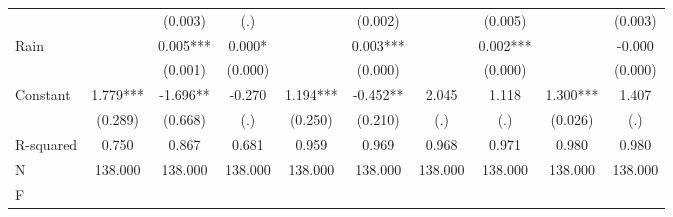 {\begin{tabular}{l*{9}{c}}
                    &               &     (0.003)   &         (.)   &               &     (0.002)   &               &     (0.005)   &               &     (0.003)   \\
Rain                &               &       0.005***&       0.000*  &               &       0.003***&               &       0.002***&               &      -0.000   \\
                    &               &     (0.001)   &     (0.000)   &               &     (0.000)   &               &     (0.000)   &               &     (0.000)   \\
Constant            &       1.779***&      -1.696** &      -0.270   &       1.194***&      -0.452** &       2.045   &       1.118   &       1.300***&       1.407   \\
                    &     (0.289)   &     (0.668)   &         (.)   &     (0.250)   &     (0.210)   &         (.)   &         (.)   &     (0.026)   &         (.)   \\
\hline
R-squared           &       0.750   &       0.867   &       0.681   &       0.959   &       0.969   &       0.968   &       0.971   &       0.980   &       0.980   \\
N                   &     138.000   &     138.000   &     138.000   &     138.000   &     138.000   &     138.000   &     138.000   &     138.000   &     138.000   \\
F                   &               &               &               &               &               &               &               &               &               \\
\hline\hline
\end{tabular}
}
